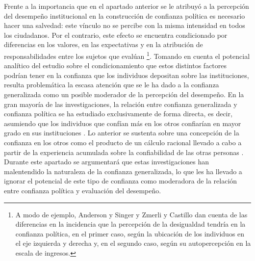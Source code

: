 \documentclass[12pt,twoside]{templates/facsothesis}
\begin{document}
Frente a la importancia que en el apartado anterior se le atribuyó a la percepción del desempeño institucional en la construcción de confianza política es necesario hacer una salvedad: este vínculo no se percibe con la misma intensidad en todos los ciudadanos. Por el contrario, este efecto se encuentra condicionado por diferencias en los valores, en las expectativas y en la atribución de responsabilidades entre los sujetos que evalúan \citep{vandermeerEconomicPerformancePolitical2018, vandermeerPoliticalTrustEvaluation2017} \footnote{A modo de ejemplo, Anderson y Singer \citeyearpar{andersonSensitiveLeftImpervious2008} y Zmerli y Castillo \citeyearpar{zmerliIncomeInequalityDistributive2015} dan cuenta de las diferencias en la incidencia que la percepción de la desigualdad tendría en la confianza política, en el primer caso, según la ubicación de los individuos en el eje izquierda y derecha y, en el segundo caso, según su autopercepción en la escala de ingresos.}. Tomando en cuenta el potencial analítico del estudio sobre el condicionamiento que estos distintos factores podrían tener en la confianza que los individuos depositan sobre las instituciones, resulta problemática la escasa atención que se le ha dado a la confianza generalizada como un posible moderador de la percepción del desempeño. En la gran mayoría de las investigaciones, la relación entre confianza generalizada y confianza política se ha estudiado exclusivamente de forma directa, es decir, asumiendo que los individuos que confían más en los otros confiarían en mayor grado en sus instituciones \citep{boothLegitimacyPuzzleLatin2009, mainwaringStateDeficienciesParty2006, mattesSocialPoliticalTrust2018, morrisCorruptionTrustTheoretical2010, zmerliWinnersLosersThree2013}. Lo anterior se sustenta sobre una concepción de la confianza en los otros como el producto de un cálculo racional llevado a cabo a partir de la experiencia acumulada sobre la confiabilidad de las otras personas \citep{newtonSocialPoliticalTrust2017}. Durante este apartado se argumentará que estas investigaciones han malentendido la naturaleza de la confianza generalizada, lo que les ha llevado a ignorar el potencial de este tipo de confianza como moderadora de la relación entre confianza política y evaluación del desempeño.
\end{document}
